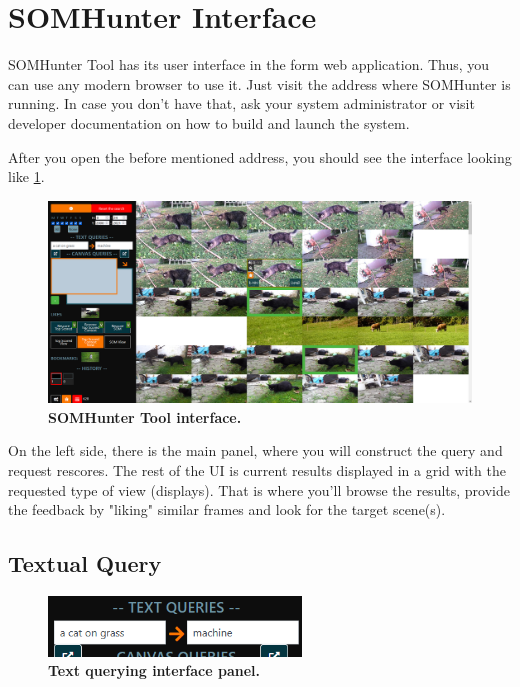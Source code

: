 \section{SOMHunter Interface}
\label{sec:interface}

SOMHunter Tool has its user interface in the form web application. Thus, you can use any modern browser to use it. Just visit the address where SOMHunter is running. In case you don't have that, ask your system administrator or visit developer documentation on how to build and launch the system.

After you open the before mentioned address, you should see the interface looking like \cref{fig:ui}.

\begin{figure}[h]
	\centering
	\includegraphics[width=1.0\textwidth]{img/ui.png}
  \caption{\textbf{SOMHunter Tool interface.}}
	\label{fig:ui}
\end{figure}


On the left side, there is the main panel, where you will construct the query and request rescores. The rest of the UI is current results displayed in a grid with the requested type of view (displays).  That is where you'll browse the results, provide the feedback by "liking" similar frames and look for the target scene(s).


\subsection{Textual Query}
\begin{figure}[h]
	\centering
	\includegraphics[width=0.6\textwidth]{img/text-query.png}
  \caption{\textbf{Text querying interface panel.}}
	\label{fig:text-query}
\end{figure}

